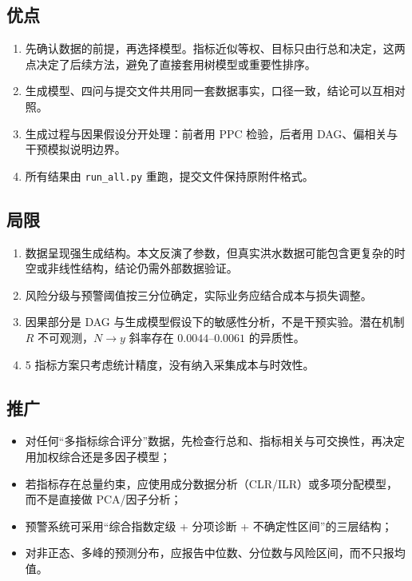 \documentclass{article}
\begin{document}
\subsection{优点}
\begin{enumerate}
  \item 先确认数据的前提，再选择模型。指标近似等权、目标只由行总和决定，这两点决定了后续方法，避免了直接套用树模型或重要性排序。
  \item 生成模型、四问与提交文件共用同一套数据事实，口径一致，结论可以互相对照。
  \item 生成过程与因果假设分开处理：前者用 PPC 检验，后者用 DAG、偏相关与干预模拟说明边界。
  \item 所有结果由 \texttt{run\_all.py} 重跑，提交文件保持原附件格式。
\end{enumerate}

\subsection{局限}
\begin{enumerate}
  \item 数据呈现强生成结构。本文反演了参数，但真实洪水数据可能包含更复杂的时空或非线性结构，结论仍需外部数据验证。
  \item 风险分级与预警阈值按三分位确定，实际业务应结合成本与损失调整。
  \item 因果部分是 DAG 与生成模型假设下的敏感性分析，不是干预实验。潜在机制 \(R\) 不可观测，\(N\to y\) 斜率存在 \(0.0044\)–\(0.0061\) 的异质性。
  \item 5 指标方案只考虑统计精度，没有纳入采集成本与时效性。
\end{enumerate}

\subsection{推广}
\begin{itemize}
  \item 对任何“多指标综合评分”数据，先检查行总和、指标相关与可交换性，再决定用加权综合还是多因子模型；
  \item 若指标存在总量约束，应使用成分数据分析（CLR/ILR）或多项分配模型，而不是直接做 PCA/因子分析；
  \item 预警系统可采用“综合指数定级 + 分项诊断 + 不确定性区间”的三层结构；
  \item 对非正态、多峰的预测分布，应报告中位数、分位数与风险区间，而不只报均值。
\end{itemize}
\end{document}
